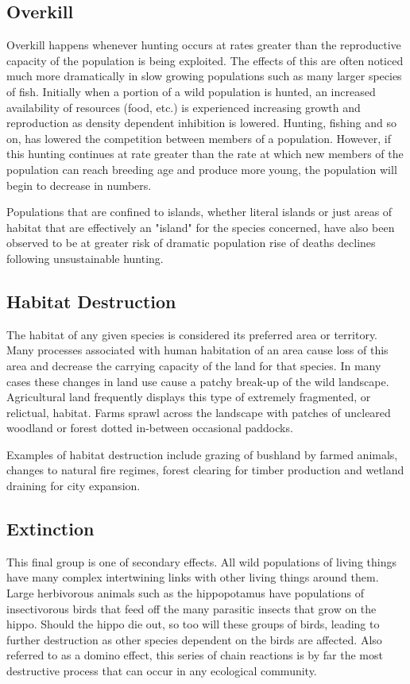 \documentclass[a4paper,11pt]{report}
\begin{document}
\subsection{Overkill}
Overkill happens whenever hunting occurs at rates greater than the reproductive capacity of the population is being exploited. The effects of this are often noticed much more dramatically in slow growing populations such as many larger species of fish. Initially when a portion of a wild population is hunted, an increased availability of resources (food, etc.) is experienced increasing growth and reproduction as density dependent inhibition is lowered. Hunting, fishing and so on, has lowered the competition between members of a population. However, if this hunting continues at rate greater than the rate at which new members of the population can reach breeding age and produce more young, the population will begin to decrease in numbers.

Populations that are confined to islands, whether literal islands or just areas of habitat that are effectively an "island" for the species concerned, have also been observed to be at greater risk of dramatic population rise of deaths declines following unsustainable hunting. 
\subsection{Habitat Destruction}
The habitat of any given species is considered its preferred area or territory. Many processes associated with human habitation of an area cause loss of this area and decrease the carrying capacity of the land for that species. In many cases these changes in land use cause a patchy break-up of the wild landscape. Agricultural land frequently displays this type of extremely fragmented, or relictual, habitat. Farms sprawl across the landscape with patches of uncleared woodland or forest dotted in-between occasional paddocks.

Examples of habitat destruction include grazing of bushland by farmed animals, changes to natural fire regimes, forest clearing for timber production and wetland draining for city expansion. 
\subsection{Extinction}
This final group is one of secondary effects. All wild populations of living things have many complex intertwining links with other living things around them. Large herbivorous animals such as the hippopotamus have populations of insectivorous birds that feed off the many parasitic insects that grow on the hippo. Should the hippo die out, so too will these groups of birds, leading to further destruction as other species dependent on the birds are affected. Also referred to as a domino effect, this series of chain reactions is by far the most destructive process that can occur in any ecological community.
\end{document}
